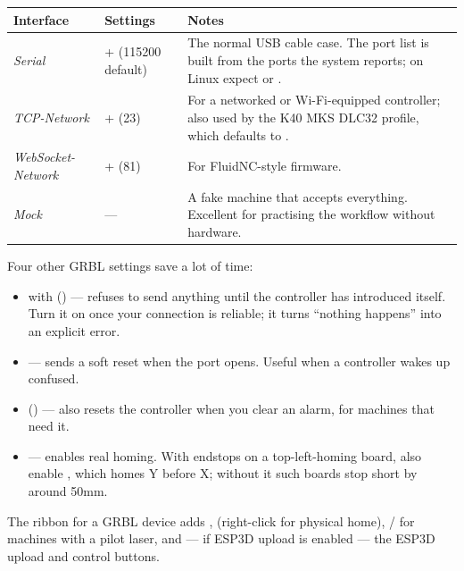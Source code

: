 \begin{center}\small
\begin{tabular}{@{}L{2.6cm}L{3.4cm}L{8.3cm}@{}}
\toprule
\textbf{Interface} & \textbf{Settings} & \textbf{Notes} \\
\midrule
\emph{Serial} &  +  (115200 default) & The
normal USB cable case. The port list is built from the ports the system reports;
on Linux expect  or . \\
\emph{TCP-Network} &  +  (23) & For a networked or
Wi-Fi-equipped controller; also used by the K40 MKS DLC32 profile, which defaults
to . \\
\emph{WebSocket-Network} &  +  (81) & For FluidNC-style
firmware. \\
\emph{Mock} & --- & A fake machine that accepts everything. Excellent for
practising the workflow without hardware. \\
\bottomrule
\end{tabular}
\end{center}

\noindent Four other GRBL settings save a lot of time:

\begin{itemize}
  \item {} with  () ---
        refuses to send anything until the controller has introduced itself. Turn
        it on once your connection is reliable; it turns ``nothing happens'' into
        an explicit error.
  \item {} --- sends a soft reset when the port opens. Useful
        when a controller wakes up confused.
  \item {} () --- also
        resets the controller when you clear an alarm, for machines that need it.
  \item {} --- enables real homing. With endstops on a
        top-left-homing board, also enable , which homes Y
        before X; without it such boards stop short by around 50\unit{mm}.
\end{itemize}

\noindent The ribbon for a GRBL device adds , 
(right-click for physical home), / for
machines with a pilot laser, and --- if ESP3D upload is enabled --- the ESP3D
upload and control buttons.

